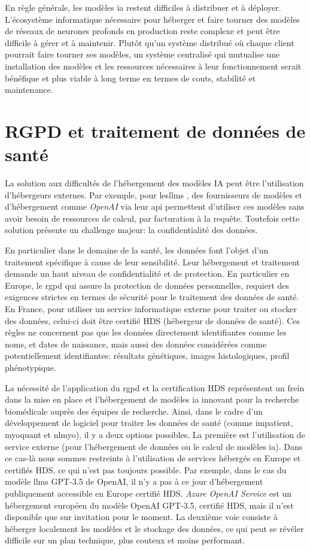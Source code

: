En règle générale, les modèles \gls{ia} restent difficiles à distribuer et à déployer. L'écosystème informatique nécessaire pour héberger et faire tourner des modèles de réseaux de neurones profonds en production reste complexe et peut être difficile à gérer et à maintenir. Plutôt qu'un système distribué où chaque client pourrait faire tourner ses modèles,  un système centralisé qui mutualise une installation des modèles et les ressources nécessaires à leur fonctionnement serait bénéfique et plus viable à long terme en termes de couts, stabilité et maintenance.

\section{RGPD et traitement de données de santé}
La solution aux difficultés de l'hébergement des modèles IA peut être l'utilisation d'hébergeurs externes. Par exemple, pour les\gls{llms} , des fournisseurs de modèles et d'hébergement comme \textit{OpenAI} via leur \gls{api} permettent d'utiliser ces modèles sans avoir besoin de ressources de calcul, par facturation à la requête. Toutefois cette solution présente un challenge majeur: la confidentialité des données.

En particulier dans le domaine de la santé, les données font l'objet d'un traitement spécifique à cause de leur sensibilité. Leur hébergement et traitement demande un haut niveau de confidentialité et de protection. En particulier en Europe, le \gls{rgpd} qui assure la protection de données personnelles, requiert des exigences strictes en termes de sécurité pour le traitement des données de santé. En France, pour utiliser un service informatique externe pour traiter ou stocker des données, celui-ci doit être certifié HDS (hébergeur de données de santé). Ces règles ne concernent pas que les données directement identifiantes comme les noms, et dates de naissance, mais aussi des données considérées comme potentiellement identifiantes: résultats génétiques, images histologiques, profil phénotypique. 

La nécessité de l'application du \gls{rgpd} et la certification HDS représentent un frein dans la mise en place et l'hébergement de modèles \gls{ia} innovant pour la recherche biomédicale auprès des équipes de recherche. Ainsi, dans le cadre d'un développement de logiciel pour traiter les données de santé (comme \gls{impatient}, \gls{myoquant} et \gls{nlmyo}), il y a deux options possibles. La première est l'utilisation de service externe (pour l'hébergement de données ou le calcul de modèles \gls{ia}). Dans ce cas-là nous sommes restreints à l'utilisation de services hébergés en Europe et certifiés HDS, ce qui n'est pas toujours possible. Par exemple, dans le cas du modèle \gls{llms} GPT-3.5 de OpenAI, il n'y a pas à ce jour d'hébergement publiquement accessible en Europe certifié HDS. \textit{Azure OpenAI Service} est un hébergement européen du modèle OpenAI GPT-3.5, certifié HDS, mais il n'est disponible que sur invitation pour le moment.  La deuxième voie consiste à héberger localement les modèles et le stockage des données, ce qui peut se révéler difficile sur un plan technique, plus couteux et moins performant.

